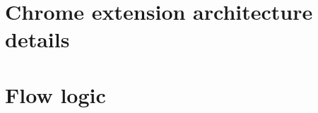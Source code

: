 \section{Chrome extension architecture details}
\label{sec:ExtDetails}

\section{Flow logic}
\label{sec:FlowLogic}